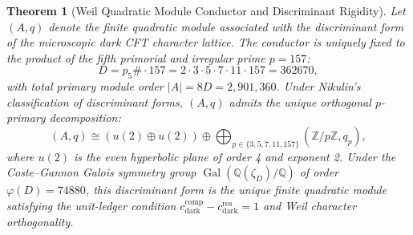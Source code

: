 \documentclass[11pt,letterpaper]{article}
\theoremstyle{plain}
\newtheorem{theorem}{Theorem}
\begin{document}
\begin{theorem}[Weil Quadratic Module Conductor and Discriminant Rigidity]
\label{thm:weil-module-rigidity}
Let $(A, q)$ denote the finite quadratic module associated with the discriminant form of the microscopic dark CFT character lattice. The conductor is uniquely fixed to the product of the fifth primorial and irregular prime $p = 157$:
\begin{equation}
D = p_5\# \cdot 157 = 2 \cdot 3 \cdot 5 \cdot 7 \cdot 11 \cdot 157 = 362670,
\end{equation}
with total primary module order $|A| = 8D = 2,901,360$. Under Nikulin's classification of discriminant forms, $(A, q)$ admits the unique orthogonal $p$-primary decomposition:
\begin{equation}
(A, q) \cong (u(2) \oplus u(2)) \oplus \bigoplus_{p \in \{3, 5, 7, 11, 157\}} (\mathbb{Z}/p\mathbb{Z}, q_p),
\end{equation}
where $u(2)$ is the even hyperbolic plane of order 4 and exponent 2. Under the Coste--Gannon Galois symmetry group $\operatorname{Gal}(\mathbb{Q}(\zeta_D)/\mathbb{Q})$ of order $\varphi(D) = 74880$, this discriminant form is the unique finite quadratic module satisfying the unit-ledger condition $c_{\mathrm{dark}}^{\mathrm{comp}} - c_{\mathrm{dark}}^{\mathrm{res}} = 1$ and Weil character orthogonality.
\end{theorem}
\end{document}
